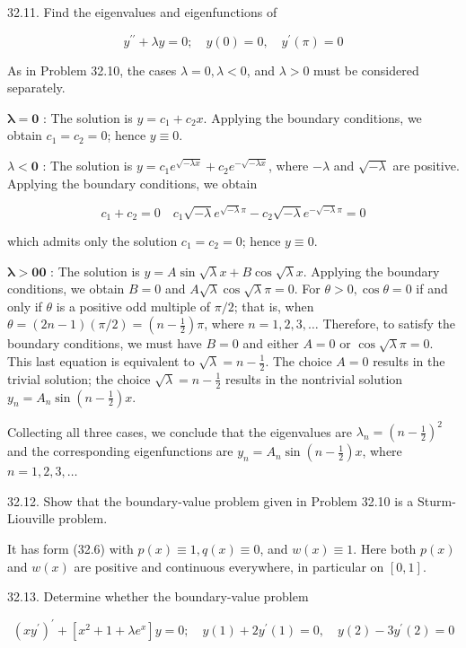 \documentclass[10pt]{article}
\begin{document}
32.11. Find the eigenvalues and eigenfunctions of

$$
y^{\prime \prime}+\lambda y=0 ; \quad y(0)=0, \quad y^{\prime}(\pi)=0
$$

As in Problem 32.10, the cases $\lambda=0, \lambda<0$, and $\lambda>0$ must be considered separately.

$\boldsymbol{\lambda}=\mathbf{0}$ : The solution is $y=c_{1}+c_{2} x$. Applying the boundary conditions, we obtain $c_{1}=c_{2}=0$; hence $y \equiv 0$.

$\lambda<\mathbf{0}$ : The solution is $y=c_{1} e^{\sqrt{-\lambda x}}+c_{2} e^{-\sqrt{-\lambda x}}$, where $-\lambda$ and $\sqrt{-\lambda}$ are positive. Applying the boundary conditions, we obtain

$$
c_{1}+c_{2}=0 \quad c_{1} \sqrt{-\lambda} e^{\sqrt{-\lambda} \pi}-c_{2} \sqrt{-\lambda} e^{-\sqrt{-\lambda} \pi}=0
$$

which admits only the solution $c_{1}=c_{2}=0$; hence $y \equiv 0$.

$\mathbf{\lambda > 0} \mathbf{0}$ : The solution is $y=A \sin \sqrt{\lambda} x+B \cos \sqrt{\lambda} x$. Applying the boundary conditions, we obtain $B=0$ and $A \sqrt{\lambda} \cos \sqrt{\lambda} \pi=0$. For $\theta>0, \cos \theta=0$ if and only if $\theta$ is a positive odd multiple of $\pi / 2$; that is, when $\theta=(2 n-1)(\pi / 2)=\left(n-\frac{1}{2}\right) \pi$, where $n=1,2,3, \ldots$ Therefore, to satisfy the boundary conditions, we must have $B=0$ and either $A=0$ or $\cos \sqrt{\lambda} \pi=0$. This last equation is equivalent to $\sqrt{\lambda}=n-\frac{1}{2}$. The choice $A=0$ results in the trivial solution; the choice $\sqrt{\lambda}=n-\frac{1}{2}$ results in the nontrivial solution $y_{n}=A_{n} \sin \left(n-\frac{1}{2}\right) x$.

Collecting all three cases, we conclude that the eigenvalues are $\lambda_{n}=\left(n-\frac{1}{2}\right)^{2}$ and the corresponding eigenfunctions are $y_{n}=A_{n} \sin \left(n-\frac{1}{2}\right) x$, where $n=1,2,3, \ldots$

32.12. Show that the boundary-value problem given in Problem 32.10 is a Sturm-Liouville problem.

It has form (32.6) with $p(x) \equiv 1, q(x) \equiv 0$, and $w(x) \equiv 1$. Here both $p(x)$ and $w(x)$ are positive and continuous everywhere, in particular on $[0,1]$.

32.13. Determine whether the boundary-value problem

$$
\left(x y^{\prime}\right)^{\prime}+\left[x^{2}+1+\lambda e^{x}\right] y=0 ; \quad y(1)+2 y^{\prime}(1)=0, \quad y(2)-3 y^{\prime}(2)=0
$$
\end{document}
